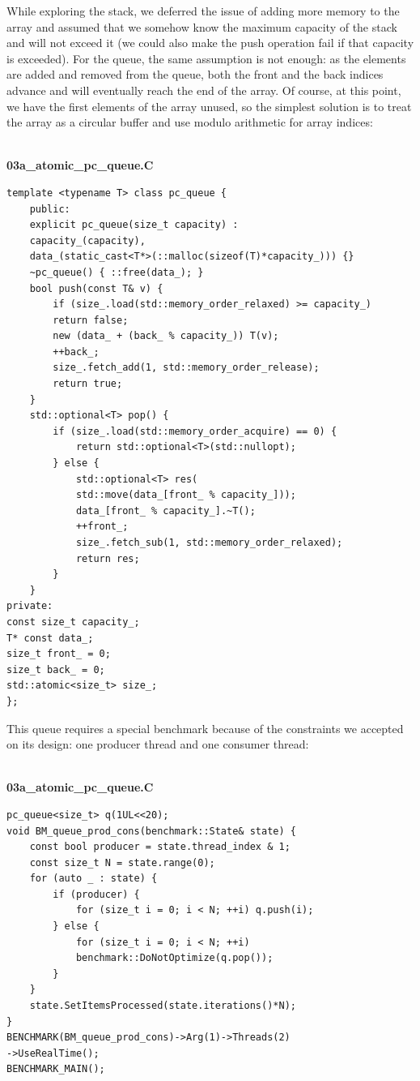 While exploring the stack, we deferred the issue of adding more memory to the array and assumed that we somehow know the maximum capacity of the stack and will not exceed it (we could also make the push operation fail if that capacity is exceeded). For the queue, the same assumption is not enough: as the elements are added and removed from the queue, both the front and the back indices advance and will eventually reach the end of the array. Of course, at this point, we have the first elements of the array unused, so the simplest solution is to treat the array as a circular buffer and use modulo arithmetic for array indices:

\hspace*{\fill} \\ %
\noindent
\textbf{03a\_atomic\_pc\_queue.C}
\begin{lstlisting}[style=styleCXX]
template <typename T> class pc_queue {
	public:
	explicit pc_queue(size_t capacity) : 
	capacity_(capacity),
	data_(static_cast<T*>(::malloc(sizeof(T)*capacity_))) {}
	~pc_queue() { ::free(data_); }
	bool push(const T& v) {
		if (size_.load(std::memory_order_relaxed) >= capacity_)
		return false;
		new (data_ + (back_ % capacity_)) T(v);
		++back_;
		size_.fetch_add(1, std::memory_order_release);
		return true;
	}
	std::optional<T> pop() {
		if (size_.load(std::memory_order_acquire) == 0) {
			return std::optional<T>(std::nullopt);
		} else {
			std::optional<T> res(
			std::move(data_[front_ % capacity_]));
			data_[front_ % capacity_].~T();
			++front_;
			size_.fetch_sub(1, std::memory_order_relaxed);
			return res;
		}
	}
private:
const size_t capacity_;
T* const data_;
size_t front_ = 0;
size_t back_ = 0;
std::atomic<size_t> size_;
};
\end{lstlisting}

This queue requires a special benchmark because of the constraints we accepted on its design: one producer thread and one consumer thread:

\hspace*{\fill} \\ %
\noindent
\textbf{03a\_atomic\_pc\_queue.C}
\begin{lstlisting}[style=styleCXX]
pc_queue<size_t> q(1UL<<20);
void BM_queue_prod_cons(benchmark::State& state) {
	const bool producer = state.thread_index & 1;
	const size_t N = state.range(0);
	for (auto _ : state) {
		if (producer) {
			for (size_t i = 0; i < N; ++i) q.push(i);
		} else {
			for (size_t i = 0; i < N; ++i) 
			benchmark::DoNotOptimize(q.pop());
		}
	}
	state.SetItemsProcessed(state.iterations()*N);
}
BENCHMARK(BM_queue_prod_cons)->Arg(1)->Threads(2)
->UseRealTime();
BENCHMARK_MAIN();
\end{lstlisting}

